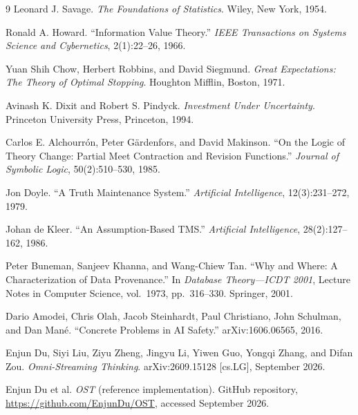 \documentclass[11pt]{article}
\begin{document}
\begin{thebibliography}{9}
Leonard J. Savage.
\textit{The Foundations of Statistics}.
Wiley, New York, 1954.

Ronald A. Howard.
``Information Value Theory.''
\textit{IEEE Transactions on Systems Science and Cybernetics}, 2(1):22--26, 1966.

Yuan Shih Chow, Herbert Robbins, and David Siegmund.
\textit{Great Expectations: The Theory of Optimal Stopping}.
Houghton Mifflin, Boston, 1971.

Avinash K. Dixit and Robert S. Pindyck.
\textit{Investment Under Uncertainty}.
Princeton University Press, Princeton, 1994.

Carlos E. Alchourrón, Peter Gärdenfors, and David Makinson.
``On the Logic of Theory Change: Partial Meet Contraction and Revision Functions.''
\textit{Journal of Symbolic Logic}, 50(2):510--530, 1985.

Jon Doyle.
``A Truth Maintenance System.''
\textit{Artificial Intelligence}, 12(3):231--272, 1979.

Johan de Kleer.
``An Assumption-Based TMS.''
\textit{Artificial Intelligence}, 28(2):127--162, 1986.

Peter Buneman, Sanjeev Khanna, and Wang-Chiew Tan.
``Why and Where: A Characterization of Data Provenance.''
In \textit{Database Theory---ICDT 2001}, Lecture Notes in Computer Science, vol.\ 1973, pp.\ 316--330. Springer, 2001.

Dario Amodei, Chris Olah, Jacob Steinhardt, Paul Christiano, John Schulman, and Dan Mané.
``Concrete Problems in AI Safety.''
arXiv:1606.06565, 2016.

Enjun Du, Siyi Liu, Ziyu Zheng, Jingyu Li, Yiwen Guo, Yongqi Zhang, and Difan Zou.
\textit{Omni-Streaming Thinking}.
arXiv:2609.15128 [cs.LG], September 2026.

Enjun Du et al.
\textit{OST} (reference implementation).
GitHub repository, \url{https://github.com/EnjunDu/OST}, accessed September 2026.
\end{thebibliography}
\end{document}
